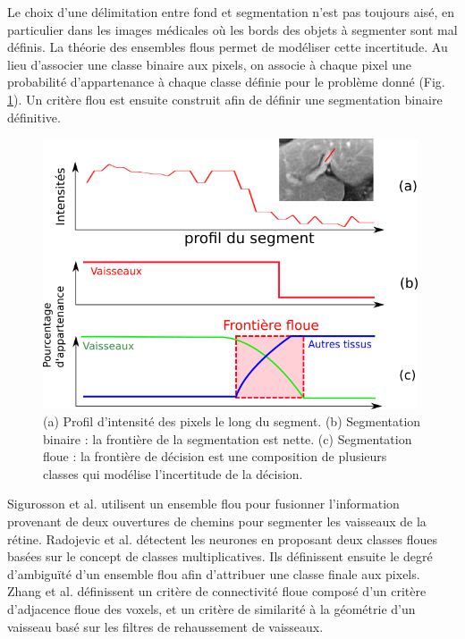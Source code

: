       Le choix d'une délimitation entre fond et segmentation n'est pas toujours aisé, en particulier dans les images médicales où les bords des objets à segmenter sont mal définis. La théorie des ensembles flous permet de modéliser cette incertitude. Au lieu d'associer une classe binaire aux pixels, on associe à chaque pixel une probabilité d'appartenance à chaque classe définie pour le problème donné (Fig. \ref{fig:fuzzy_segmentation}). Un critère flou est ensuite construit afin de définir une segmentation binaire définitive.

      \begin{figure}[h]
        \centering
        \includegraphics[height=8cm]{Images/fuzzy_segmentation.png}
        \caption{(a) Profil d'intensité des pixels le long du segment. (b) Segmentation binaire : la frontière de la segmentation est nette. (c) Segmentation floue : la frontière de décision est une composition de plusieurs classes qui modélise l'incertitude de la décision.}
        \label{fig:fuzzy_segmentation}
      \end{figure}

      Sigurosson et al. \cite{Sigurosson2014_retinal_morpho_fuzzy} utilisent un ensemble flou pour fusionner l'information provenant de deux ouvertures de chemins pour segmenter les vaisseaux de la rétine. 
      Radojevic et al. \cite{Radojevic2015_fuzzy_logic} détectent les neurones en proposant deux classes floues basées sur le concept de classes multiplicatives. Ils définissent ensuite le degré d'ambiguïté d'un ensemble flou afin d'attribuer une classe finale aux pixels.
      Zhang et al. \cite{Zhang2018_liver_fuzzy_connectedness} définissent un critère de connectivité floue composé d'un critère d'adjacence floue des voxels, et un critère de similarité à la géométrie d'un vaisseau basé sur les filtres de rehaussement de vaisseaux.  

